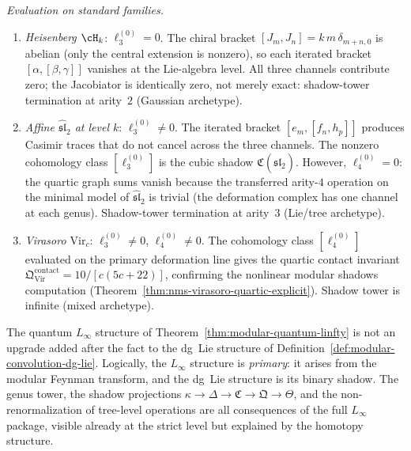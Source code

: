 \begin{construction}
\emph{Evaluation on standard families.}
\begin{enumerate}[label=\textup{(\alph*)}]
\item \emph{Heisenberg $\cH_k$}: $\ell_3^{(0)} = 0$.
  The chiral bracket $[J_m, J_n] = k\,m\,\delta_{m+n,0}$ is
  abelian (only the central extension is nonzero), so each
  iterated bracket $[\alpha, [\beta, \gamma]]$ vanishes at the
  Lie-algebra level.  All three channels contribute zero; the
  Jacobiator is identically zero, not merely exact:
  shadow-tower termination at arity~$2$ (Gaussian archetype).
\item \emph{Affine $\widehat{\mathfrak{sl}}_2$ at level $k$}:
  $\ell_3^{(0)} \neq 0$.
  The iterated bracket $[e_m, [f_n, h_p]]$ produces Casimir traces
  that do not cancel across the three channels.  The nonzero
  cohomology class $[\ell_3^{(0)}]$ is the cubic shadow
  $\mathfrak{C}(\widehat{\mathfrak{sl}}_2)$.
  However, $\ell_4^{(0)} = 0$: the quartic graph sums vanish
  because the transferred arity-$4$ operation on the minimal model
  of $\widehat{\mathfrak{sl}}_2$ is trivial (the deformation
  complex has one channel at each genus).  Shadow-tower termination
  at arity~$3$ (Lie/tree archetype).
\item \emph{Virasoro $\mathrm{Vir}_c$}: $\ell_3^{(0)} \neq 0$,
  $\ell_4^{(0)} \neq 0$.  The cohomology class
  $[\ell_4^{(0)}]$ evaluated on the primary deformation line gives
  the quartic contact invariant
  $\mathfrak{Q}^{\mathrm{contact}}_{\mathrm{Vir}}
  = 10/[c(5c+22)]$, confirming the nonlinear modular shadows
  computation
  (Theorem~\ref{thm:nms-virasoro-quartic-explicit}).
  Shadow tower is infinite (mixed archetype).
\end{enumerate}
\end{construction}

\begin{remark}
\label{rem:linfty-logical-priority}
The quantum $L_\infty$ structure of
Theorem~\ref{thm:modular-quantum-linfty} is not an upgrade added
after the fact to the dg~Lie structure of
Definition~\ref{def:modular-convolution-dg-lie}.  Logically, the
$L_\infty$ structure is \emph{primary}: it arises from the modular
Feynman transform, and the dg~Lie structure is its binary shadow.
The genus tower, the shadow projections
$\kappa \to \Delta \to \mathfrak{C} \to \mathfrak{Q} \to \Theta$,
and the non-renormalization of tree-level operations are all
consequences of the full $L_\infty$ package, visible already at the
strict level but explained by the homotopy structure.
\end{remark}

